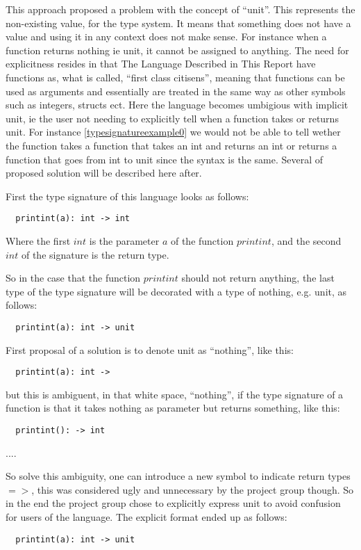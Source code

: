 This approach proposed a problem with the concept of \enquote{unit}. This represents the non-existing value, for the type system. It means that something does not have a value and using it in any context does not make sense. For instance when a function returns nothing ie unit, it cannot be assigned to anything. The need for explicitness resides in that The Language Described in This Report have functions as, what is called, \enquote{first class citisens}, meaning that functions can be used as arguments and essentially are treated in the same way as other symbols such as integers, structs ect. Here the language becomes umbigious with implicit unit, ie the user not needing to explicitly tell when a function takes or returns unit. For instance \cref{typesignatureexample0} we would not be able to tell wether the function takes a function that takes an int and returns an int or returns a function that goes from int to unit since the syntax is the same.
Several of proposed solution will be described here after.

First the type signature of this language looks as follows:
\begin{verbatim}
  printint(a): int -> int
\end{verbatim}
Where the first $int$ is the parameter $a$ of the function $printint$, and the second $int$ of the signature is the return type.

So in the case that the function $printint$ should not return anything, the last type of the type signature will be decorated with a type of nothing, e.g. unit, as follows:
\begin{verbatim}
  printint(a): int -> unit
\end{verbatim}

First proposal of a solution is to denote unit as \enquote{nothing}, like this:
\begin{verbatim}
  printint(a): int ->
\end{verbatim}
but this is ambiguent, in that white space, \enquote{nothing}, if the type signature of a function is that it takes nothing as parameter but returns something, like this:
\begin{verbatim}
  printint(): -> int
\end{verbatim}
.... %


So solve this ambiguity, one can introduce a new symbol to indicate return types $=>$, this was considered ugly and unnecessary by the project group though. So in the end the project group chose to explicitly express unit to avoid confusion for users of the language. The explicit format ended up as follows:
\begin{verbatim}
  printint(a): int -> unit
\end{verbatim}

